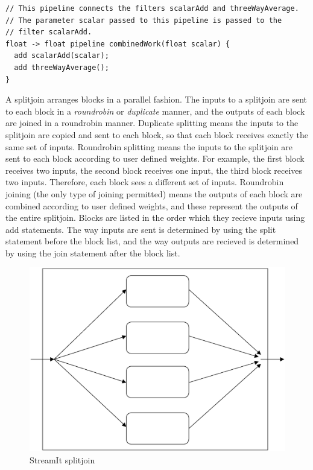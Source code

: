 \begin{scriptsize}
\begin{verbatim}
// This pipeline connects the filters scalarAdd and threeWayAverage.
// The parameter scalar passed to this pipeline is passed to the
// filter scalarAdd.
float -> float pipeline combinedWork(float scalar) {
  add scalarAdd(scalar);
  add threeWayAverage();
}
\end{verbatim}
\end{scriptsize}

    A splitjoin arranges blocks in a parallel fashion.  The inputs to
a splitjoin are sent to each block in a \textit{roundrobin} or
\textit{duplicate} manner, and the outputs of each block are
joined in a roundrobin manner. Duplicate splitting means the
inputs to the splitjoin are copied and sent to each block, so that
each block receives exactly the same set of inputs.  Roundrobin
splitting means the inputs to the splitjoin are sent to each block
according to user defined weights.  For example, the first block
receives two inputs, the second block receives one input, the
third block receives two inputs.  Therefore, each block sees a
different set of inputs. Roundrobin joining (the only type of
joining permitted) means the outputs of each block are combined
according to user defined weights, and these represent the outputs
of the entire splitjoin. Blocks are listed in the order which they
recieve inputs using add statements. The way inputs are sent is
determined by using the split statement before the block list, and
the way outputs are recieved is determined by using the join
statement after the block list.

\begin{figure}[bthp]
  \centering
  \includegraphics[width=6.0in]{figures/splitjoin.eps}
  \caption{StreamIt splitjoin}
  \label{fig:splitjoin}
\end{figure}


